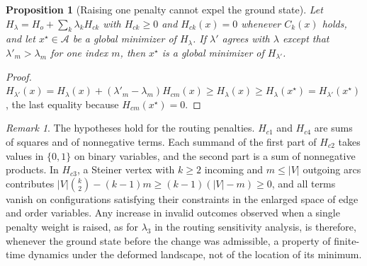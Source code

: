\documentclass[11pt]{article}
\newtheorem{proposition}{Proposition}
\theoremstyle{definition}
\theoremstyle{remark}
\newtheorem*{remark}{Remark}
\newcommand{\A}{\mathcal{A}}
\begin{document}
\begin{proposition}[Raising one penalty cannot expel the ground state]\label{prop:penalty}
Let $H_\lambda = H_o + \sum_k \lambda_k H_{ck}$ with $H_{ck} \geq 0$ and $H_{ck}(x) = 0$ whenever $C_k(x)$ holds, and let $x^\star \in \A$ be a global minimizer of $H_\lambda$. If $\lambda'$ agrees with $\lambda$ except that $\lambda'_m > \lambda_m$ for one index $m$, then $x^\star$ is a global minimizer of $H_{\lambda'}$.
\end{proposition}
\begin{proof}
$H_{\lambda'}(x) = H_\lambda(x) + (\lambda'_m - \lambda_m) H_{cm}(x) \geq H_\lambda(x) \geq H_\lambda(x^\star) = H_{\lambda'}(x^\star)$, the last equality because $H_{cm}(x^\star) = 0$.
\end{proof}
\begin{remark}
The hypotheses hold for the routing penalties. $H_{c1}$ and $H_{c4}$ are sums of squares and of nonnegative terms. Each summand of the first part of $H_{c2}$ takes values in $\{0,1\}$ on binary variables, and the second part is a sum of nonnegative products. In $H_{c3}$, a Steiner vertex with $k \geq 2$ incoming and $m \leq |V|$ outgoing arcs contributes $|V|\binom{k}{2} - (k-1)m \geq (k-1)(|V| - m) \geq 0$, and all terms vanish on configurations satisfying their constraints in the enlarged space of edge and order variables. Any increase in invalid outcomes observed when a single penalty weight is raised, as for $\lambda_3$ in the routing sensitivity analysis, is therefore, whenever the ground state before the change was admissible, a property of finite-time dynamics under the deformed landscape, not of the location of its minimum.
\end{remark}
\end{document}
